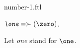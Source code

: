 \documentclass{stex}
\begin{document}
\begin{smodule}{number-1.ftl}



\begin{definition}[forthel,id=OneDef]
  $\emph{\one} = \succ(\zero)$.

  Let \emph{one} stand for $\one$.
\end{definition}

\end{smodule}
\end{document}
